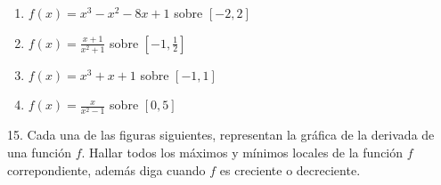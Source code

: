 \documentclass[12pt]{article}
\begin{document}
\begin{enumerate}[\hspace{9px} a)]
    \item \(f(x)=x^3-x^2-8x+1\) sobre $[-2,2]$
    \item \(f(x)=\displaystyle\frac{x+1}{x^2+1}\) sobre $\left[-1,\frac{1}{2}\right]$
    \item \(f(x)=x^3+x+1\) sobre $[-1,1]$
    \item \(f(x)=\displaystyle\frac{x}{x^2-1}\) sobre $[0,5]$
\end{enumerate}

15. Cada una de las figuras siguientes, representan la gr\'afica de la derivada de una funci\'on $f$. Hallar todos los m\'aximos y m\'inimos locales de la funci\'on $f$ correpondiente, adem\'as diga cuando $f$ es creciente o decreciente.
\end{document}
